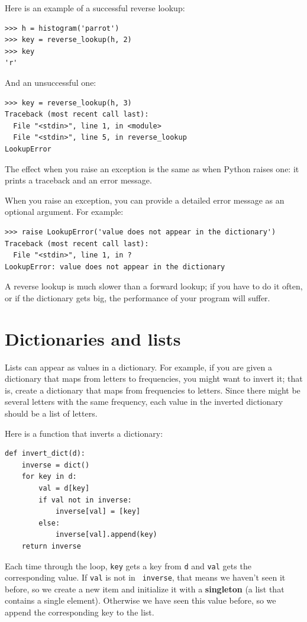 \documentclass[10pt]{book}
\begin{document}
Here is an example of a successful reverse lookup:

\begin{verbatim}
>>> h = histogram('parrot')
>>> key = reverse_lookup(h, 2)
>>> key
'r'
\end{verbatim}
%
And an unsuccessful one:

\begin{verbatim}
>>> key = reverse_lookup(h, 3)
Traceback (most recent call last):
  File "<stdin>", line 1, in <module>
  File "<stdin>", line 5, in reverse_lookup
LookupError
\end{verbatim}
%
The effect when you raise an exception is the same as when
Python raises one: it prints a traceback and an error message.

When you raise an exception, you can provide a detailed error message as an optional argument.  For example:

\begin{verbatim}
>>> raise LookupError('value does not appear in the dictionary')
Traceback (most recent call last):
  File "<stdin>", line 1, in ?
LookupError: value does not appear in the dictionary
\end{verbatim}
%
A reverse lookup is much slower than a forward lookup; if you
have to do it often, or if the dictionary gets big, the performance
of your program will suffer.


\section{Dictionaries and lists}
\label{invert}

Lists can appear as values in a dictionary.  For example, if you
are given a dictionary that maps from letters to frequencies, you
might want to invert it; that is, create a dictionary that maps
from frequencies to letters.  Since there might be several letters
with the same frequency, each value in the inverted dictionary
should be a list of letters.

Here is a function that inverts a dictionary:

\begin{verbatim}
def invert_dict(d):
    inverse = dict()
    for key in d:
        val = d[key]
        if val not in inverse:
            inverse[val] = [key]
        else:
            inverse[val].append(key)
    return inverse
\end{verbatim}
%
Each time through the loop, {\tt key} gets a key from {\tt d} and 
{\tt val} gets the corresponding value.  If {\tt val} is not in {\tt
  inverse}, that means we haven't seen it before, so we create a new
item and initialize it with a {\bf singleton} (a list that contains a
single element).  Otherwise we have seen this value before, so we
append the corresponding key to the list.  
\end{document}
